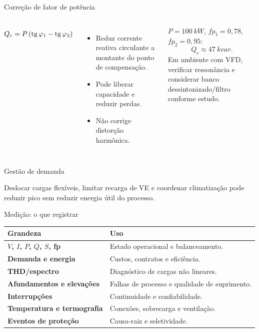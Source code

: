 \begin{frame}{Correção de fator de potência}
\small
\begin{columns}[T,onlytextwidth]
\begin{align*}
Q_c=P\left(\operatorname{tg}\varphi_1-\operatorname{tg}\varphi_2\right)
\end{align*}
\begin{itemize}
\item Reduz corrente reativa circulante a montante do ponto de compensação.
\item Pode liberar capacidade e reduzir perdas.
\item Não corrige distorção harmônica.
\end{itemize}
\begin{caixaEx}
$P=\SI{100}{kW}$, $fp_1=0{,}78$, $fp_2=0{,}95$:
\[
Q_c\approx\SI{47}{kvar}.
\]
Em ambiente com VFD, verificar ressonância e considerar banco dessintonizado/filtro conforme estudo.
\end{caixaEx}
\end{columns}
\end{frame}

\begin{frame}{Gestão de demanda}
\small
\centering
{}
\begin{caixaObs}
Deslocar cargas flexíveis, limitar recarga de VE e coordenar climatização pode reduzir pico sem reduzir energia útil do processo.
\end{caixaObs}
\end{frame}

\begin{frame}{Medição: o que registrar}
\scriptsize
\begin{tabularx}{\textwidth}{>{\bfseries}p{4.0cm}X}
\toprule
Grandeza & Uso \\
\midrule
$V$, $I$, $P$, $Q$, $S$, fp & Estado operacional e balanceamento. \\
Demanda e energia & Custos, contratos e eficiência. \\
THD/espectro & Diagnóstico de cargas não lineares. \\
Afundamentos e elevações & Falhas de processo e qualidade de suprimento. \\
Interrupções & Continuidade e confiabilidade. \\
Temperatura e termografia & Conexões, sobrecarga e ventilação. \\
Eventos de proteção & Causa-raiz e seletividade. \\
\bottomrule
\end{tabularx}
\end{frame}


